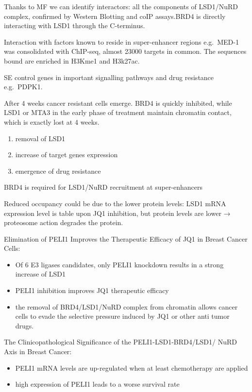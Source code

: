 Thanks to MF we can identify interactors: all the components of LSD1/NuRD complex, confirmed
by Western Blotting and coIP assays.BRD4 is directly interacting with LSD1 through the C-terminus.

Interaction with factors known to reside in super-enhancer regions
e.g.~MED-1 was consolidated with ChIP-seq, almost 23000 targets in common.
The sequences bound are enriched in H3Kme1 and H3k27ac.

SE control genes in important signalling pathways and drug resistance e.g.~PDPK1.

After 4 weeks cancer resistant cells emerge. BRD4 is quickly inhibited,
while LSD1 or MTA3 in the early phase of treatment maintain chromatin
contact, which is exactly lost at 4 weeks.
\begin{enumerate}
\tightlist
\item
  removal of LSD1
\item
  increase of target genes expression
\item
  emergence of drug resistance
\end{enumerate}

BRD4 is required for LSD1/NuRD recruitment at super-enhancers

Reduced occupancy could be due to the lower protein levels: LSD1 mRNA
expression level is table upon JQ1 inhibition, but protein levels are
lower → proteosome action degrades the protein.

Elimination of PELI1 Improves the Therapeutic Efficacy of JQ1 in Breast Cancer Cells:
\begin{itemize}
\tightlist
\item
  Of 6 E3 ligases candidates, only PELI1 knockdown results in a strong
  increase of LSD1
\item
  PELI1 inhibition improves JQ1 therapeutic efficacy
\item
  the removal of BRD4/LSD1/NuRD complex from chromatin allows cancer
  cells to evade the selective pressure induced by JQ1 or other anti
  tumor drugs.
\end{itemize}

The Clinicopathological Significance of the
PELI1-LSD1-BRD4/LSD1/ NuRD Axis in Breast
Cancer:

\begin{itemize}
\tightlist
\item
  PELI1 mRNA levels are up-regulated when at least chemotherapy are
  applied
\item
  high expression of PELI1 leads to a worse survival rate
\end{itemize}

